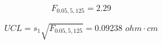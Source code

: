 \documentclass[12pt]{article}
\begin{document}
\pagestyle{empty}
\Large
{}
\pagecolor{ehandbook}

\boldmath
\[
F_{0.05, 5, 125} = 2.29
\]

\vspace*{.25in}

\[
UCL = s_1 \sqrt{F_{0.05, 5, 125}} = 0.09238 \,\, ohm \cdot cm
\]
\end{document}
